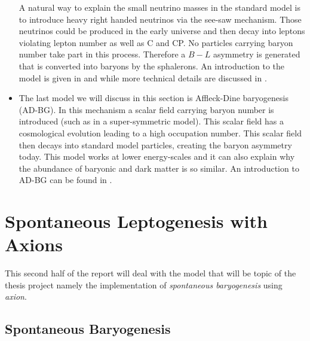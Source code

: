 \documentclass[13pt,a4paper,titlepage]{article}
\begin{document}
\begin{itemize}
    A natural way to explain the small neutrino masses in the standard model is to introduce heavy right handed neutrinos via the see-saw mechanism.
    Those neutrinos could be produced in the early universe and then decay into leptons violating lepton number as well as C and CP. No particles carrying baryon
    number take part in this process.
    Therefore a $B - L$ asymmetry is generated that is converted into baryons by the sphalerons. An introduction to the model is given in \cite{Leptogenesis_review_doi:10.1146/annurev.nucl.55.090704.151558} and \cite{Leptogenesis_Buchmüller:2014} while more technical details are discussed in \cite{Pedestrians_Buchm_ller_2005}.
    \item The last model we will discuss in this section is Affleck-Dine baryogenesis (AD-BG).
    In this mechanism a scalar field carrying baryon number is introduced (such as in a super-symmetric model).
    This scalar field has a cosmological evolution leading to a high occupation number. This scalar field then decays into standard model particles, creating the baryon asymmetry today.
    This model works at lower energy-scales and it can also explain why the abundance of baryonic and dark matter is so similar. An introduction to AD-BG can be found in \cite[Part III]{Dine_2003_Bayrogenesis}.
\end{itemize}


\section{Spontaneous Leptogenesis with Axions}
\label{sec:spontaneour_bayrogenesis}
This second half of the report will deal with the model that will be
topic of the thesis project namely the implementation of \emph{spontaneous baryogenesis} using \emph{axion}.

\subsection{Spontaneous Baryogenesis}
\label{sec:spontaneour_bayrogenesis_tradiaonal}
\end{document}
